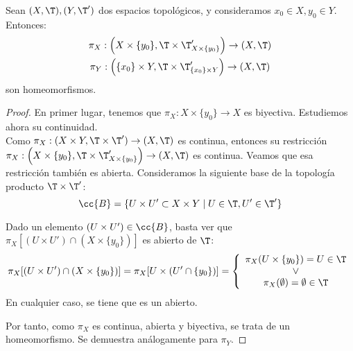 \begin{prop}
    Sean $(X,\T), (Y,\T')$ dos espacios topológicos, y consideramos $x_0\in X,y_0\in Y$. Entonces:
    \begin{gather*}
        \pi_X:\left(X\times \{y_0\},\T\times \T'_{X\times \{y_0\}} \right)\to (X,\T)\\
        \pi_Y:\left(\{x_0\}\times Y,\T\times \T'_{\{x_0\}\times Y} \right)\to (X,\T)\\
    \end{gather*}
    son homeomorfismos.
\end{prop}
\begin{proof}
    En primer lugar, tenemos que $\pi_X:X\times\{y_0\}\to X$ es biyectiva. Estudiemos ahora su continuidad.\\

    Como $\pi_X:(X\times Y,\T\times \T')\to (X,\T)$ es continua, entonces su restricción $\pi_X:\left(X\times \{y_0\},\T\times \T'_{X\times \{y_0\}} \right)\to (X,\T)$ es continua. Veamos que esa restricción también es abierta. Consideramos la siguiente base de la topología producto $\T\times \T'$:
    $$\cc{B}=\{U\times U'\subset X\times Y\mid U\in \T, U'\in \T'\}$$

    Dado un elemento $(U\times U')\in \cc{B}$, basta ver que $\pi_X[(U\times U')\cap (X\times \{y_0\})]$ es abierto de $\T$:
    \begin{equation*}
        \pi_X[(U\times U')\cap (X\times \{y_0\})] = \pi_X[U \times (U'\cap \{y_0\})] = \left\{
        \begin{array}{c}
            \pi_X(U\times \{y_0\}) = U\in \T\\ \lor \\
            \pi_X(\emptyset) = \emptyset \in \T
        \end{array}
        \right.
    \end{equation*}
    En cualquier caso, se tiene que es un abierto.

    Por tanto, como $\pi_X$ es continua, abierta y biyectiva, se trata de un homeomorfismo. Se demuestra análogamente para $\pi_Y$.
\end{proof}

